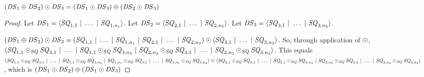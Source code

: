 \documentclass[acmsmall]{acmart}
\begin{document}
\begin{lemma}
  \label{lem:dnf-distribute-right}
  $(\mathit{DS}_1 \oplus \mathit{DS}_2) \odot \mathit{DS}_3 =
  (\mathit{DS}_1 \odot \mathit{DS}_3) \oplus
  (\mathit{DS}_2 \odot \mathit{DS}_3)$
\end{lemma}
\begin{proof}
  Let $\mathit{DS}_1 = \langle\mathit{SQ}_{1,1} ~|~ \ldots ~|~ \mathit{SQ}_{1,n_1}\rangle$.
  Let $\mathit{DS}_2 = \langle\mathit{SQ}_{2,1} ~|~ \ldots ~|~ \mathit{SQ}_{2,n_2}\rangle$.
  Let $\mathit{DS}_3 = \langle\mathit{SQ}_{3,1} ~|~ \ldots ~|~ \mathit{SQ}_{3,n_3}\rangle$.

  $(\mathit{DS}_1 \oplus \mathit{DS}_2) \odot \mathit{DS}_3 =
  (\mathit{SQ}_{1,1} ~|~ \ldots ~|~ \mathit{SQ}_{1,n_1} ~|~ 
  \mathit{SQ}_{2,1} ~|~ \ldots ~|~ \mathit{SQ}_{2,n_2}) \odot
  \langle\mathit{SQ}_{3,1} ~|~ \ldots ~|~ \mathit{SQ}_{3,n_3}\rangle$.
  So, through application of $\odot$,
  $\langle\mathit{SQ}_{1,1}\odot_{\mathit{SQ}}\mathit{SQ}_{3,1} ~|~ \ldots ~|~ 
    \mathit{SQ}_{1,1}\odot_{\mathit{SQ}}\mathit{SQ}_{3,n_3} ~|~ 
    \mathit{SQ}_{2,n_2}\odot_{\mathit{SQ}}\mathit{SQ}_{3,1} ~|~ \ldots ~|~ 
    \mathit{SQ}_{2,n_2}\odot_{\mathit{SQ}}\mathit{SQ}_{3,n_3}\rangle$.  This equals
  $\langle\mathit{SQ}_{1,1}\odot_{\mathit{SQ}}\mathit{SQ}_{3,1} ~|~ \ldots ~|~ 
    \mathit{SQ}_{1,1}\odot_{\mathit{SQ}}\mathit{SQ}_{3,n_3} ~|~ 
    \mathit{SQ}_{1,n_1}\odot_{\mathit{SQ}}\mathit{SQ}_{3,1} ~|~ \ldots ~|~ 
    \mathit{SQ}_{1,n_1}\odot_{\mathit{SQ}}\mathit{SQ}_{3,n_3}\rangle \oplus
  \langle\mathit{SQ}_{2,1}\odot_{\mathit{SQ}}\mathit{SQ}_{3,1} ~|~ \ldots ~|~ 
    \mathit{SQ}_{2,1}\odot_{\mathit{SQ}}\mathit{SQ}_{3,n_3} ~|~ 
    \mathit{SQ}_{2,n_2}\odot_{\mathit{SQ}}\mathit{SQ}_{3,1} ~|~ \ldots ~|~ 
    \mathit{SQ}_{2,n_2}\odot_{\mathit{SQ}}\mathit{SQ}_{3,n_3}\rangle$, which is
  $(\mathit{DS}_1 \odot \mathit{DS}_2) \oplus
  (\mathit{DS}_1 \odot \mathit{DS}_3)$
\end{proof}
\end{document}
